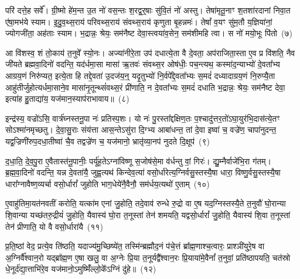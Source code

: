 परि॑ दत्ते॒ह सर्वे᳚। ग्री॒ष्मो हे॑म॒न्त उ॒त नो॑ वस॒न्तः श॒रद्व॒र्॒\mbox{}षाः सु॑वि॒तं नो॑ अस्तु। तेषा॑मृतू॒नाꣳ श॒तशा॑रदानां निवा॒त ए॑षा॒मभ॑ये स्याम। इ॒दु॒व॒थ्स॒राय॑ परिवथ्स॒राय॑ संवथ्स॒राय॑ कृणुता बृ॒हन्नमः॑। तेषां᳚ व॒यꣳ सु॑म॒तौ य॒ज्ञिया॑नां॒ ज्योगजी॑ता॒ अह॑ताः स्याम। भ॒द्रान्नः॒ श्रेयः॒ सम॑नैष्ट देवा॒स्त्वया॑व॒सेन॒ सम॑शीमहि त्वा। स नो॑ मयो॒भूः पि॑तो~(७)

आ वि॑शस्व॒ शं तो॒काय॑ त॒नुवे᳚ स्यो॒नः। अज्या॑नीरे॒ता उप॑ दधात्ये॒ता वै दे॒वता॒ अप॑राजिता॒स्ता ए॒व प्र वि॑शति॒ नैव जी॑यते ब्रह्मवा॒दिनो॑ वदन्ति॒ यद॑र्धमा॒सा मासा॑ ऋ॒तवः॑ संवथ्स॒र ओष॑धीः॒ पच॒न्त्यथ॒ कस्मा॑द॒न्याभ्यो॑ दे॒वता᳚भ्य आग्रय॒णं निरु॑प्यत॒ इत्ये॒ता हि तद्दे॒वता॑ उ॒दज॑य॒न्॒ यदृ॒तुभ्यो॑ नि॒र्वपे᳚द्दे॒वता᳚भ्यः स॒मदं॑ दध्यादाग्रय॒णं नि॒रुप्यै॒ता आहु॑तीर्जुहोत्यर्धमा॒साने॒व मासा॑नृ॒तून्थ्सं॑वथ्स॒रं प्री॑णाति॒ न दे॒वता᳚भ्यः स॒मदं॑ दधाति भ॒द्रान्नः॒ श्रेयः॒ सम॑नैष्ट देवा॒ इत्या॑ह हु॒ताद्या॑य॒ यज॑मान॒स्याप॑राभावाय॥~(८)

{\anuvakamend[{प्रा॒जा॒प॒त्यां लो॒काय॑ देवाः पितो दध्यादाग्रय॒णं पञ्च॑विꣳशतिश्च}]}%

इन्द्र॑स्य॒ वज्रो॑\-ऽसि॒ वार्त्र॑घ्नस्तनू॒पा नः॑ प्रतिस्प॒शः। यो नः॑ पु॒रस्ता᳚द्दक्षिण॒तः प॒श्चादु॑त्तर॒तो॑\-ऽघा॒युर॑भि॒दास॑त्ये॒तꣳ सो\-ऽश्मा॑नमृच्छतु। दे॒वा॒सु॒राः संय॑त्ता आस॒न्ते\-ऽसु॑रा दि॒ग्भ्य आबा॑धन्त॒ तां दे॒वा इष्वा॑ च॒ वज्रे॑ण॒ चापा॑नुदन्त॒ यद्व॒ज्रिणी॑रुप॒दधा॒तीष्वा॑ चै॒व तद्वज्रे॑ण च॒ यज॑मानो॒ भ्रातृ॑व्या॒नप॑ नुदते दि॒क्षूप॑~(९)

द॒धा॒ति॒ दे॒व॒पु॒रा ए॒वैतास्त॑नू॒पानीः॒ पर्यू॑ह॒ते\-ऽग्ना॑विष्णू स॒जोष॑से॒मा व॑र्धन्तु वां॒ गिरः॑। द्यु॒म्नैर्वाजे॑भि॒रा ग॑तम्। ब्र॒ह्म॒वा॒दिनो॑ वदन्ति॒ यन्न दे॒वता॑यै॒ जुह्व॒त्यथ॑ किन्देव॒त्या॑ वसो॒र्धारेत्य॒ग्निर्वसु॒स्तस्यै॒षा धारा॒ विष्णु॒र्वसु॒स्तस्यै॒षा धारा᳚ग्नावैष्ण॒व्यर्चा वसो॒र्धारां᳚ जुहोति भाग॒धेये॑नै॒वैनौ॒ सम॑र्धय॒त्यथो॑ ए॒ताम्~(१०)

ए॒वाहु॑तिमा॒यत॑नवतीं करोति॒ यत्का॑म एनां जु॒होति॒ तदे॒वाव॑ रुन्धे रु॒द्रो वा ए॒ष यद॒ग्निस्तस्यै॒ते त॒नुवौ॑ घो॒रान्या शि॒वान्या यच्छ॑तरु॒द्रीयं॑ जु॒होति॒ यैवास्य॑ घो॒रा त॒नूस्तां तेन॑ शमयति॒ यद्वसो॒र्धारां᳚ जु॒होति॒ यैवास्य॑ शि॒वा त॒नूस्तां तेन॑ प्रीणाति॒ यो वै वसो॒र्धारा॑यै~(११)

प्र॒ति॒ष्ठां वेद॒ प्रत्ये॒व ति॑ष्ठति॒ यदाज्य॑मु॒च्छिष्ये॑त॒ तस्मि॑न्ब्रह्मौद॒नं प॑चे॒त्तं ब्रा᳚ह्म॒णाश्च॒त्वारः॒ प्राश्ञी॑युरे॒ष वा अ॒ग्निर्वै᳚श्वान॒रो यद्ब्रा᳚ह्म॒ण ए॒षा खलु॒ वा अ॒ग्नेः प्रि॒या त॒नूर्यद्वै᳚श्वान॒रः प्रि॒याया॑मे॒वैनां᳚ त॒नुवां॒ प्रति॑\-ष्ठापयति॒ चत॑स्रो धे॒नूर्द॑द्या॒त्ताभि॑रे॒व यज॑मानो॒\-ऽमुष्मिँ॑ल्लो॒के᳚\-ऽग्निं दु॑हे॥~(१२)

